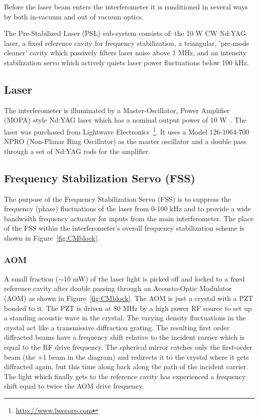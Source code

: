Before the laser beam enters the interferometer it is conditioned in several ways
by both in-vacuum and out of vacuum optics.

The Pre-Stabilized Laser (PSL) sub-system consists of: the 10 W CW Nd:YAG laser,
a fixed reference cavity for frequency stabilization, a triangular,
'pre-mode cleaner' cavity which passively filters laser noise above 1 MHz, and
an intensity stabilization servo which actively quiets laser power fluctuations below
100 kHz.

\subsection{Laser}

The interferometer is illuminated by a Master-Oscillator, Power Amplifier (MOPA) 
style Nd:YAG laser which has a nominal output power of 10 W~\cite{Rick:Laser}. The
laser was purchased from Lightwave Electronics~\footnote{
\href{http://www.lwecorp.com}{http://www.lwecorp.com}}. It uses a Model
126-1064-700 NPRO (Non-Planar Ring Oscillator) as the master oscillator and a 
double pass through a set of Nd:YAG rods for the amplifier.

\subsection{Frequency Stabilization Servo (FSS)}

The purpose of the Frequency Stabilization Servo (FSS) is to suppress the
frequency (phase) fluctuations of the laser from 0-100 kHz and to provide
a wide bandwidth frequency actuator for inputs from the main interferometer.
The place of the FSS within the interferometer's overall frequency stabilization
scheme is shown in {Figure~\ref{fig:CMblock}.}

\subsubsection{AOM}

A small fraction ($\sim$10 mW) of the laser light is picked off and locked to a
fixed reference cavity after double passing through an Acousto-Optic
Modulator (AOM) as shown in Figure~\ref{fig:CMblock}. The AOM is just
a crystal with a PZT bonded to it. The PZT is driven at 80 MHz by a high
power RF source to set up a standing acoustic wave in the crystal. The varying
density fluctuations in the crystal act like a transmissive diffraction grating.
The resulting first order diffracted beams have a frequency shift relative to the incident
carrier which is equal to the RF drive frequency. The spherical mirror catches
only the first-order beam (the +1 beam in the diagram) and redirects it to the
crystal where it gets diffracted again, but this time along back along the path
of the incident carrier. The light which finally gets to the reference cavity
has experienced a frequency shift equal to twice the AOM drive frequency.

